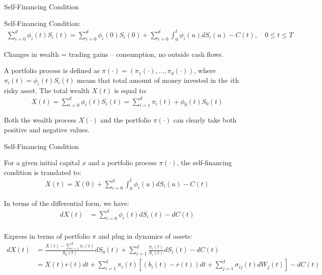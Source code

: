 \documentclass{beamer}
\begin{document}
\begin{frame}{Self-Financing Condition}

    {\footnotesize \footnotesize
    \par Self-Financing Condition:
    \begin{align*}
        \sum_{i=0}^d \phi_i(t)S_i(t) = \sum_{i=0}^d \phi_i(0)S_i(0) + \sum_{i=0}^d \int_0^t \phi_i(u) dS_i(u) - C(t), \quad 0 \leq t \leq T
    \end{align*}
    \par Changes in wealth = trading gains – consumption, no outside cash flows.
    \vspace{1em}
    \par A portfolio process is defined as $\pi(\cdot) = (\pi_1(\cdot), \ldots, \pi_d(\cdot))$, where $\pi_i(t) = \phi_i(t) S_i(t)$ means that 
    total amount of money invested in the $i$th risky asset. The total wealth $X(t)$ is equal to:
    \begin{align*}
        X(t) = \sum_{i=0}^d \phi_i(t) S_i(t) = \sum_{i=1}^d \pi_i(t) + \phi_0(t) S_0(t)
    \end{align*}
    \par Both the wealth process $X(\cdot)$ and the portfolio $\pi(\cdot)$ can clearly take both positive and negative values.
    }   
\end{frame}

\begin{frame}{Self-Financing Condition}

    {\footnotesize \footnotesize
    \par For a given initial capital \( x \) and a portfolio process \( \pi(\cdot) \), the self-financing condition is translated to:
    \begin{align*}
        X(t) = X(0) + \sum_{i=0}^{d} \int_{0}^{t} \phi_i(u) dS_i(u) - C(t)
    \end{align*}
    \par In terms of the differential form, we have:
    \begin{align*}
        dX(t) &= \sum_{i=0}^{d} \phi_i(t) dS_i(t) - dC(t) \\
    \end{align*}
    \vspace{-2em}
    \par Express in terms of portfolio $\pi$ and plug in dynamics of assets:
    \begin{align*}
        dX(t) &= \frac{X(t) - \sum_{i=1}^{d} \pi_i(t)}{S_0(t)} dS_0(t) + \sum_{i=1}^{d} \frac{\pi_i(t)}{S_i(t)} dS_i(t) - dC(t) \\
        &= X(t) r(t) dt + \sum_{i=1}^{d} \pi_i(t) \left[ (b_i(t) - r(t)) dt + \sum_{j=1}^{d} \sigma_{ij}(t) dW_j(t) \right] - dC(t)
    \end{align*}
    }   
\end{frame} 
\end{document}
